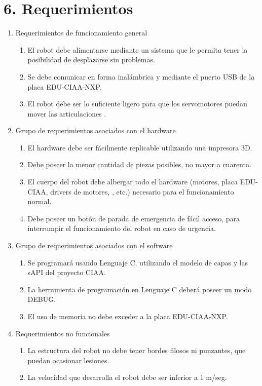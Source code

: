 \documentclass[
11pt, %
codirector, %
]{charter}
\begin{document}
\section{6. Requerimientos}
\label{sec:requerimientos}

\begin{enumerate}
\item Requerimientos de funcionamiento general
	\begin{enumerate}
	\item El robot debe alimentarse mediante un sistema que le permita tener la posibilidad de desplazarse sin problemas.
	\item Se debe comunicar en forma inalámbrica y mediante el puerto USB de la placa EDU-CIAA-NXP. 
	\item El robot debe ser lo suficiente ligero para que los servomotores puedan mover las articulaciones .
	\end{enumerate}
\item Grupo de requerimientos asociados con el hardware
	\begin{enumerate}
	\item El hardware debe ser fácilmente replicable utilizando una impresora 3D.
	\item Debe poseer la menor cantidad de piezas posibles, no mayor a cuarenta. 
	\item El cuerpo del robot debe albergar todo el hardware (motores, placa EDU-CIAA, drivers de motores, , etc.) necesario para el funcionamiento normal.
	\item Debe poseer un botón de parada de emergencia de fácil acceso, para interrumpir el funcionamiento del robot en caso de urgencia.
	\end{enumerate}
\item Grupo de requerimientos asociados con el software
	\begin{enumerate}
	\item Se programará usando Lenguaje C, utilizando el modelo de capas y las sAPI del proyecto CIAA.
	\item La herramienta de programación en Lenguaje C deberá poseer un modo DEBUG.
	\item El uso de memoria no debe exceder a la placa EDU-CIAA-NXP.
	\end{enumerate}
\item Requerimientos no funcionales
	\begin{enumerate}
	\item La estructura del robot no debe tener bordes filosos ni punzantes, que puedan ocasionar lesiones. 
	\item La velocidad que desarrolla el robot debe ser inferior a 1 m/seg.
	\end{enumerate}


\end{enumerate}
\end{document}
